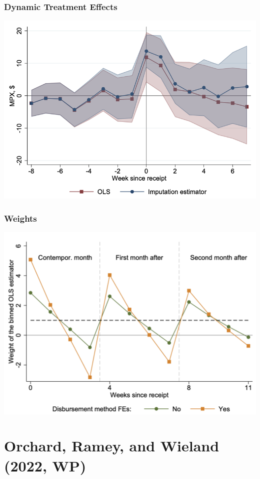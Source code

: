\documentclass[english,xcolor=svgnames]{beamer}
\begin{document}
\begin{frame}
\frametitle[alignment=center]{Dynamic Treatment Effects}
\centering
\includegraphics[scale=0.5]{figures/BJSFIG2b.png}
\end{frame}

\begin{frame}
\frametitle[alignment=center]{Weights}
\centering
\includegraphics[scale=0.5]{figures/BJSFIG3.png}
\end{frame}

\section{Orchard, Ramey, and Wieland (2022, WP)}
\end{document}
